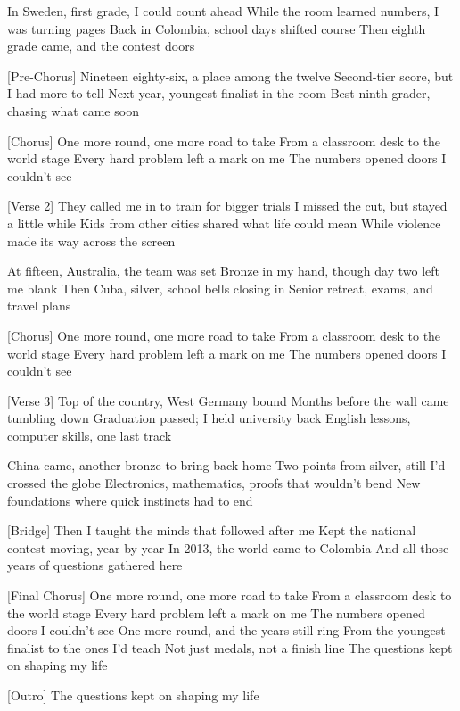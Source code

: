 \begin{lyrics}
[Verse 1]
In Sweden, first grade, I could count ahead
While the room learned numbers, I was turning pages
Back in Colombia, school days shifted course
Then eighth grade came, and the contest doors

[Pre-Chorus]
Nineteen eighty-six, a place among the twelve
Second-tier score, but I had more to tell
Next year, youngest finalist in the room
Best ninth-grader, chasing what came soon

[Chorus]
One more round, one more road to take
From a classroom desk to the world stage
Every hard problem left a mark on me
The numbers opened doors I couldn’t see

[Verse 2]
They called me in to train for bigger trials
I missed the cut, but stayed a little while
Kids from other cities shared what life could mean
While violence made its way across the screen

At fifteen, Australia, the team was set
Bronze in my hand, though day two left me blank
Then Cuba, silver, school bells closing in
Senior retreat, exams, and travel plans

[Chorus]
One more round, one more road to take
From a classroom desk to the world stage
Every hard problem left a mark on me
The numbers opened doors I couldn’t see

[Verse 3]
Top of the country, West Germany bound
Months before the wall came tumbling down
Graduation passed; I held university back
English lessons, computer skills, one last track

China came, another bronze to bring back home
Two points from silver, still I’d crossed the globe
Electronics, mathematics, proofs that wouldn’t bend
New foundations where quick instincts had to end

[Bridge]
Then I taught the minds that followed after me
Kept the national contest moving, year by year
In 2013, the world came to Colombia
And all those years of questions gathered here

[Final Chorus]
One more round, one more road to take
From a classroom desk to the world stage
Every hard problem left a mark on me
The numbers opened doors I couldn’t see
One more round, and the years still ring
From the youngest finalist to the ones I’d teach
Not just medals, not a finish line
The questions kept on shaping my life

[Outro]
The questions kept on shaping my life
\end{lyrics}
